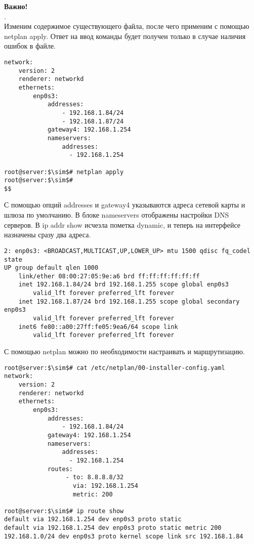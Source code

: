 \documentclass[14pt, a4paper]{article}
\begin{document}
\textbf{Важно!}  \\
.\\

Изменим содержимое существующего файла, после чего применим с помощью \colorbox{backcolour}{netplan apply}.
Ответ на ввод команды будет получен только в случае наличия ошибок в файле.

\vspace{0.3cm}
\begin{lstlisting}
network:
    version: 2
    renderer: networkd
    ethernets:
        enp0s3:
            addresses:
                - 192.168.1.84/24
                - 192.168.1.87/24
            gateway4: 192.168.1.254
            nameservers:
                addresses:
                  - 192.168.1.254

root@server:$\sim$# netplan apply
root@server:$\sim$#
$$
\end{lstlisting}
\vspace{0.2cm}

С помощью опций \colorbox{backcolour}{addresses} и \colorbox{backcolour}{gateway4} указываются адреса сетевой карты и шлюза по
умолчанию. В блоке \colorbox{backcolour}{nameservers} отображены настройки DNS серверов. В \colorbox{backcolour}{ip addr show} исчезла
пометка \colorbox{backcolour}{dynamic}, и теперь на интерфейсе назначены сразу два адреса.

\vspace{0.3cm}
\begin{lstlisting}
2: enp0s3: <BROADCAST,MULTICAST,UP,LOWER_UP> mtu 1500 qdisc fq_codel state 
UP group default qlen 1000
    link/ether 08:00:27:05:9e:a6 brd ff:ff:ff:ff:ff:ff
    inet 192.168.1.84/24 brd 192.168.1.255 scope global enp0s3
        valid_lft forever preferred_lft forever
    inet 192.168.1.87/24 brd 192.168.1.255 scope global secondary enp0s3
        valid_lft forever preferred_lft forever
    inet6 fe80::a00:27ff:fe05:9ea6/64 scope link
        valid_lft forever preferred_lft forever
\end{lstlisting}
\vspace{0.2cm}

С помощью netplan можно по необходимости настраивать и маршрутизацию.

\vspace{0.3cm}
\begin{lstlisting}
root@server:$\sim$# cat /etc/netplan/00-installer-config.yaml
network:
    version: 2
    renderer: networkd
    ethernets:
        enp0s3:
            addresses:
                - 192.168.1.84/24
            gateway4: 192.168.1.254
            nameservers:
                addresses:
                  - 192.168.1.254
            routes:
                 - to: 8.8.8.8/32
                   via: 192.168.1.254
                   metric: 200

root@server:$\sim$# ip route show
default via 192.168.1.254 dev enp0s3 proto static
default via 192.168.1.254 dev enp0s3 proto static metric 200
192.168.1.0/24 dev enp0s3 proto kernel scope link src 192.168.1.84
\end{lstlisting}
\vspace{0.2cm}
\end{document}

